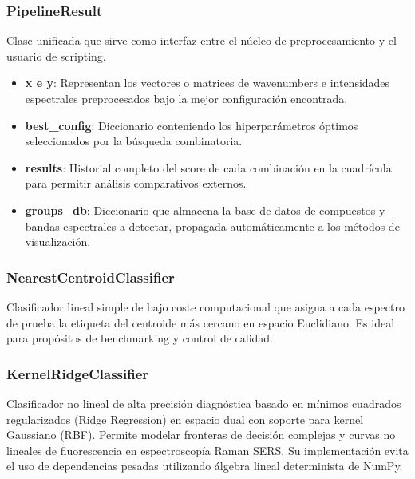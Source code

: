 \subsubsection{PipelineResult}
Clase unificada que sirve como interfaz entre el núcleo de preprocesamiento y el usuario de scripting. 
\begin{itemize}
    \item \textbf{x e y}: Representan los vectores o matrices de wavenumbers e intensidades espectrales preprocesados bajo la mejor configuración encontrada.
    \item \textbf{best\_config}: Diccionario conteniendo los hiperparámetros óptimos seleccionados por la búsqueda combinatoria.
    \item \textbf{results}: Historial completo del score de cada combinación en la cuadrícula para permitir análisis comparativos externos.
    \item \textbf{groups\_db}: Diccionario que almacena la base de datos de compuestos y bandas espectrales a detectar, propagada automáticamente a los métodos de visualización.
\end{itemize}

\subsubsection{NearestCentroidClassifier}
Clasificador lineal simple de bajo coste computacional que asigna a cada espectro de prueba la etiqueta del centroide más cercano en espacio Euclidiano. Es ideal para propósitos de benchmarking y control de calidad.

\subsubsection{KernelRidgeClassifier}
Clasificador no lineal de alta precisión diagnóstica basado en mínimos cuadrados regularizados (Ridge Regression) en espacio dual con soporte para kernel Gaussiano (RBF). Permite modelar fronteras de decisión complejas y curvas no lineales de fluorescencia en espectroscopía Raman SERS. Su implementación evita el uso de dependencias pesadas utilizando álgebra lineal determinista de NumPy.
